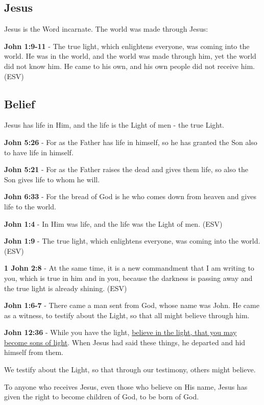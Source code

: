 \documentclass[11pt]{article}
\begin{document}
\subsection{Jesus}
\label{sec:org2faf6fa}
Jesus is the Word incarnate. The world was made through Jesus:

\textbf{John 1:9-11} - The true light, which enlightens everyone, was coming into the world. He was in the world, and the world was made through him, yet the world did not know him. He came to his own, and his own people did not receive him. (ESV)

\subsection{Belief}
\label{sec:orgd73b11d}
Jesus has life in Him, and the life is the Light of men - the true Light.

\textbf{John 5:26} - For as the Father has life in himself, so he has granted the Son also to have life in himself.

\textbf{John 5:21} - For as the Father raises the dead and gives them life, so also the Son gives life to whom he will.

\textbf{John 6:33} - For the bread of God is he who comes down from heaven and gives life to the world.

\textbf{John 1:4} - In Him was life, and the life was the Light of men. (ESV)

\textbf{John 1:9} - The true light, which enlightens everyone, was coming into the world. (ESV)

\textbf{1 John 2:8} -  At the same time, it is a new commandment that I am writing to you, which is true in him and in you, because the darkness is passing away and the true light is already shining.  (ESV)

\textbf{John 1:6-7} - There came a man sent from God, whose name was John. He came as a witness, to testify about the Light, so that all might believe through him.

\textbf{John 12:36} - While you have the light, \uline{believe in the light, that you may become sons of light}. When Jesus had said these things, he departed and hid himself from them.

We testify about the Light, so that through our testimony, others might believe.

To anyone who receives Jesus, even those who believe on His name, Jesus has given the right to become children of God, to be born of God.
\end{document}
